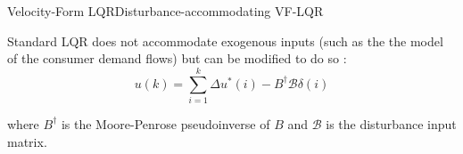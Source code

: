 \begin{frame}{Velocity-Form LQR}{Disturbance-accommodating VF-LQR}

	Standard LQR does not accommodate exogenous inputs (such as the the model of the consumer demand flows) but can be modified to do so \cite{Singh2017}:
	\begin{equation}
		u(k) = \sum_{i=1}^{k} \Delta{u}^*(i) - B^\dagger \mathcal{B}\delta(i)
	\end{equation}
	
	where $B^\dagger$ is the Moore-Penrose pseudoinverse of $B$ and $\mathcal{B}$ is the disturbance input matrix.
\end{frame}

